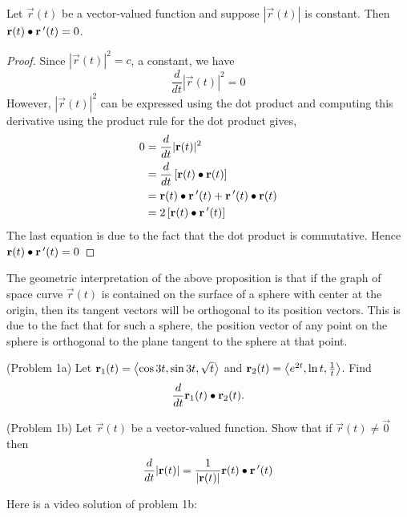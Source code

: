 \documentclass[handout]{ximera}
\begin{document}
\begin{proposition}
Let $\vec r(t)$ be a vector-valued function and suppose $|\vec r(t)|$ is constant. Then $\mathbf r(t) \bullet \mathbf r\,'(t) = 0$.\\
\end{proposition}
\begin{proof}
Since $|\vec r(t)|^2 = c$, a constant, we have
\[
\frac{d}{dt} |\vec r(t)|^2 = 0
\]
However, $|\vec r(t)|^2$ can be expressed using the dot product and computing this derivative using the product rule for the dot product gives,
\begin{align*}
0 &= \frac{d}{dt} |\mathbf r(t)|^2 \\
&= \frac{d}{dt} \left[\mathbf r(t) \bullet \mathbf r(t)\right] \\
  &= \mathbf r(t) \bullet \mathbf r\,'(t) + \mathbf r\,'(t) \bullet \mathbf r(t) \\
  &= 2 \left[\mathbf r(t) \bullet \mathbf r\,'(t)\right]
\end{align*}
The last equation is due to the fact that the dot product is commutative. Hence $\mathbf r(t) \bullet \mathbf r\,'(t) = 0$
\end{proof}

\begin{remark}
The geometric interpretation of the above proposition is that if the graph of space curve $\vec r(t)$ is contained 
on the surface of a sphere with center at the origin,
then its tangent vectors will be orthogonal to its position vectors.  
This is due to the fact that for such a sphere, the position vector of any point on the sphere is 
orthogonal to the plane tangent to the sphere at that point.
\end{remark}

\begin{problem}(Problem 1a)
Let $\mathbf r_1(t) = \left\langle  \cos 3t, \sin 3t, \sqrt t\right\rangle$ and  $\mathbf r_2(t) = \left\langle  e^{2t}, \ln t, \frac{1}{t}\right\rangle$. Find
\[
\frac{d}{dt} \mathbf r_1(t) \bullet \mathbf r_2(t).
\]

\end{problem}


\begin{problem}(Problem 1b)
Let $\vec r(t)$ be a vector-valued function. Show that if $\vec r(t) \neq \vec 0$ then 
\[
\frac{d}{dt} |\mathbf r(t)| = \frac{1}{|\mathbf r(t)|} \mathbf r(t) \bullet \mathbf r\,'(t)
\]
\end{problem}

Here is a video solution of problem 1b:\\
\begin{foldable}
\end{foldable}
\end{document}
